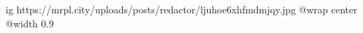  
 
 
 
 

\ifcmt
  ig https://mrpl.city/uploads/posts/redactor/ljuhoe6xhfmdmjqy.jpg
  @wrap center
  @width 0.9
\fi
